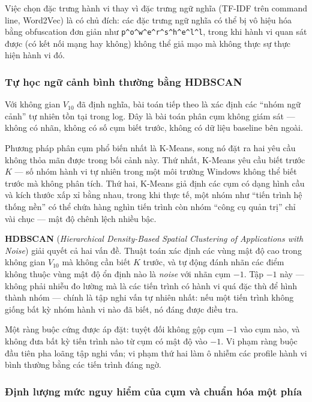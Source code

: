 \documentclass[../main.tex]{subfiles}
\begin{document}
Việc chọn đặc trưng hành vi thay vì đặc trưng ngữ nghĩa (TF-IDF trên command line, Word2Vec) là có chủ đích: các đặc trưng ngữ nghĩa có thể bị vô hiệu hóa bằng obfuscation đơn giản như \texttt{p\^{}o\^{}w\^{}e\^{}r\^{}s\^{}h\^{}e\^{}l\^{}l}, trong khi hành vi quan sát được (có kết nối mạng hay không) không thể giả mạo mà không thực sự thực hiện hành vi đó.

\subsubsection{Tự học ngữ cảnh bình thường bằng HDBSCAN}
\label{subsubsection:2.4.3.2}

Với không gian $V_{10}$ đã định nghĩa, bài toán tiếp theo là xác định các ``nhóm ngữ cảnh'' tự nhiên tồn tại trong log. Đây là bài toán phân cụm không giám sát — không có nhãn, không có số cụm biết trước, không có dữ liệu baseline bên ngoài.

Phương pháp phân cụm phổ biến nhất là K-Means, song nó đặt ra hai yêu cầu không thỏa mãn được trong bối cảnh này. Thứ nhất, K-Means yêu cầu biết trước $K$ — số nhóm hành vi tự nhiên trong một môi trường Windows không thể biết trước mà không phân tích. Thứ hai, K-Means giả định các cụm có dạng hình cầu và kích thước xấp xỉ bằng nhau, trong khi thực tế, một nhóm như ``tiến trình hệ thống nền'' có thể chứa hàng nghìn tiến trình còn nhóm ``công cụ quản trị'' chỉ vài chục — mật độ chênh lệch nhiều bậc.

\textbf{HDBSCAN} (\textit{Hierarchical Density-Based Spatial Clustering of Applications with Noise}) giải quyết cả hai vấn đề. Thuật toán xác định các vùng mật độ cao trong không gian $V_{10}$ mà không cần biết $K$ trước, và tự động đánh nhãn các điểm không thuộc vùng mật độ ổn định nào là \textit{noise} với nhãn cụm $-1$. Tập $-1$ này — không phải nhiễu đo lường mà là các tiến trình có hành vi quá đặc thù để hình thành nhóm — chính là tập nghi vấn tự nhiên nhất: nếu một tiến trình không giống bất kỳ nhóm hành vi nào đã biết, nó đáng được điều tra.

Một ràng buộc cứng được áp đặt: tuyệt đối không gộp cụm $-1$ vào cụm nào, và không đưa bất kỳ tiến trình nào từ cụm có mật độ vào $-1$. Vi phạm ràng buộc đầu tiên pha loãng tập nghi vấn; vi phạm thứ hai làm ô nhiễm các profile hành vi bình thường bằng các tiến trình đáng ngờ.

\subsubsection{Định lượng mức nguy hiểm của cụm và chuẩn hóa một phía}
\label{subsubsection:2.4.3.3}
\end{document}
